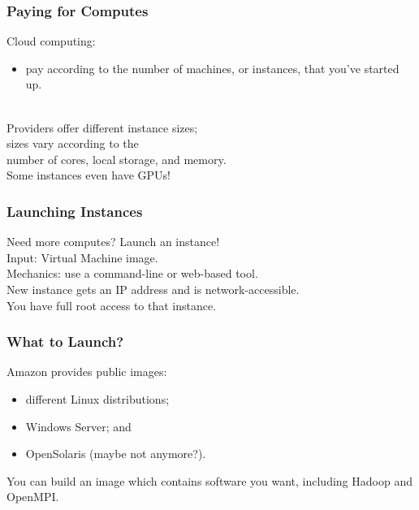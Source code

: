 \documentclass[aspectratio=43]{beamer}
\newenvironment{changemargin}[1]{%
  \begin{list}{}{%
    \setlength{\topsep}{0pt}%
    \setlength{\leftmargin}{#1}%
    \setlength{\rightmargin}{1em}
    \setlength{\listparindent}{\parindent}%
    \setlength{\itemindent}{\parindent}%
    \setlength{\parsep}{\parskip}%
  }%
  \item[]}{\end{list}}
\begin{document}
\begin{frame}
  \frametitle{Paying for Computes}

  \begin{changemargin}{1cm}
Cloud computing:
\begin{itemize}
\item pay according to the number of machines, or
instances, that you've started up.
\end{itemize}
~\\[1em]

Providers offer different instance
sizes;\\
\qquad sizes vary according to the \\ \qquad number of cores, local
storage, and memory.\\[1em]

Some instances even have GPUs!
  \end{changemargin}
\end{frame}

\begin{frame}
  \frametitle{Launching Instances}

  \begin{changemargin}{2cm}
Need more computes? Launch an instance!\\[1em]

Input: Virtual Machine image.\\[1em]

Mechanics: use a command-line or web-based tool.\\[1em]

New instance gets an IP address and is network-accessible. \\
You have full root access to that instance.
  \end{changemargin}
\end{frame}

\begin{frame}
  \frametitle{What to Launch?}

  \begin{changemargin}{2cm}
Amazon provides public images:
\begin{itemize}
\item different Linux distributions;
\item Windows Server; and
\item OpenSolaris (maybe not anymore?). 
\end{itemize}

You can build an image which contains software you
want, including Hadoop and OpenMPI.
  \end{changemargin}
\end{frame}
\end{document}
